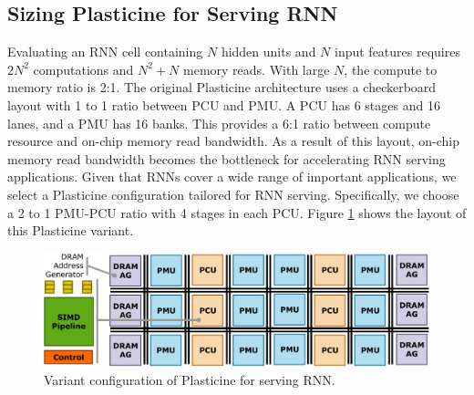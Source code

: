 \subsection{Sizing Plasticine for Serving RNN}
Evaluating an RNN cell containing $N$ hidden units and $N$ input features
  requires $2N^2$ computations and $N^2+N$ memory reads.
With large $N$, the compute to memory ratio is 2:1.
The original Plasticine architecture uses a checkerboard layout
  with 1 to 1 ratio between PCU and PMU.
A PCU has 6 stages and 16 lanes, and a PMU has 16 banks.
This provides a 6:1 ratio between
  compute resource and on-chip memory read bandwidth.
As a result of this layout,
  on-chip memory read bandwidth becomes the bottleneck for accelerating RNN serving applications.
Given that RNNs cover a wide range of important applications,
  we select a Plasticine configuration tailored for RNN serving.
Specifically, we choose a 2 to 1 PMU-PCU ratio with 4 stages in each PCU.
Figure \ref{fig:arch} shows the layout of this Plasticine variant.
\begin{figure}
  \centering
  \includegraphics[width=\columnwidth]{figs/arch.pdf}
  \caption{Variant configuration of Plasticine for serving RNN.}
  \label{fig:arch}
  \vspace*{-0.2in}
\end{figure}